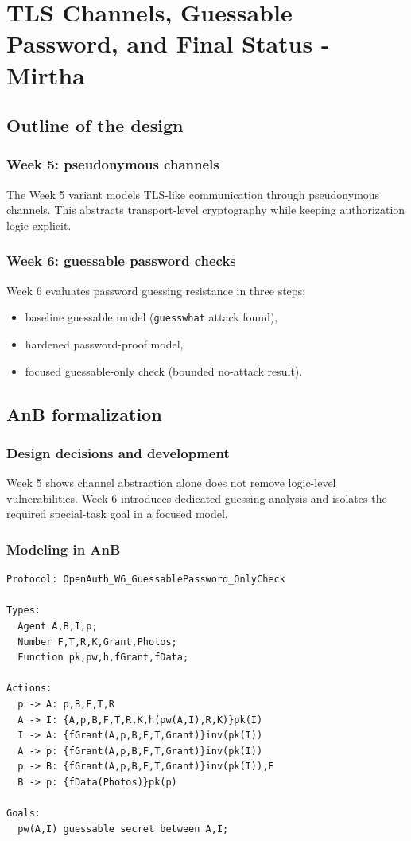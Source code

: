 \documentclass[11pt,a4paper]{article}
\begin{document}
\newpage
\section{TLS Channels, Guessable Password, and Final Status - Mirtha}

\subsection{Outline of the design}

\subsubsection{Week 5: pseudonymous channels}
The Week 5 variant models TLS-like communication through pseudonymous channels.
This abstracts transport-level cryptography while keeping authorization logic explicit.

\subsubsection{Week 6: guessable password checks}
Week 6 evaluates password guessing resistance in three steps:
\begin{itemize}
  \item baseline guessable model (\texttt{guesswhat} attack found),
  \item hardened password-proof model,
  \item focused guessable-only check (bounded no-attack result).
\end{itemize}

\subsection{AnB formalization}

\subsubsection{Design decisions and development}
Week 5 shows channel abstraction alone does not remove logic-level vulnerabilities.
Week 6 introduces dedicated guessing analysis and isolates the required special-task goal in a focused model.

\subsubsection{Modeling in AnB}
\begin{lstlisting}
Protocol: OpenAuth_W6_GuessablePassword_OnlyCheck

Types:
  Agent A,B,I,p;
  Number F,T,R,K,Grant,Photos;
  Function pk,pw,h,fGrant,fData;

Actions:
  p -> A: p,B,F,T,R
  A -> I: {A,p,B,F,T,R,K,h(pw(A,I),R,K)}pk(I)
  I -> A: {fGrant(A,p,B,F,T,Grant)}inv(pk(I))
  A -> p: {fGrant(A,p,B,F,T,Grant)}inv(pk(I))
  p -> B: {fGrant(A,p,B,F,T,Grant)}inv(pk(I)),F
  B -> p: {fData(Photos)}pk(p)

Goals:
  pw(A,I) guessable secret between A,I;
\end{lstlisting}
\end{document}
